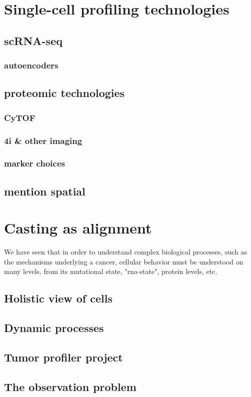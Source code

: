 \section{Single-cell profiling technologies}
\subsection{scRNA-seq}
\subsubsection{autoencoders}

\subsection{proteomic technologies}
\subsubsection{CyTOF}
\subsubsection{4i \& other imaging}
\subsubsection{marker choices}
\subsection{mention spatial}

\section{Casting as alignment}
We have seen that in order to understand complex biological processes, such as the mechanisms underlying a cancer, cellular behavior must be understood on many levels, from its mutational state, "rna-state", protein levels, etc.

\subsection{Holistic view of cells}
\subsection{Dynamic processes}
\subsection{Tumor profiler project}
\subsection{The observation problem}
